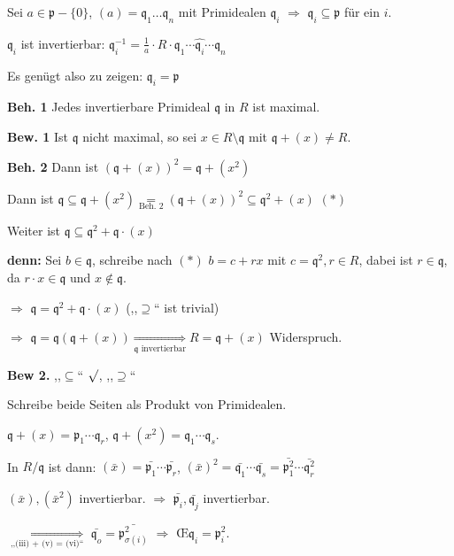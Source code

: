 \begin{Bew}
\begin{description}
Sei $a \in \mathfrak{p} - \{0\}$, $(a) = \mathfrak{q}_1 \ldots \mathfrak{q}_n$ mit Primidealen $\mathfrak{q}_i$ $\Rightarrow$ $\mathfrak{q}_i \subseteq \mathfrak{p}$ f\"ur ein $i$.

$\mathfrak{q}_i$ ist invertierbar: $\mathfrak{q}_i^{-1} = \frac{1}{a} \cdot R \cdot \mathfrak{q}_1 \cdots \widehat{\mathfrak{q}_i} \cdots \mathfrak{q}_n$

Es gen\"ugt also zu zeigen: $\mathfrak{q}_i = \mathfrak{p}$

\textbf{Beh. 1} Jedes invertierbare Primideal $\mathfrak{q}$ in $R$ ist maximal.

\textbf{Bew. 1}
Ist $\mathfrak{q}$ nicht maximal, so sei $x \in R \setminus \mathfrak{q}$ mit $\mathfrak{q} + (x) \neq R$.

\textbf{Beh. 2} Dann ist $(\mathfrak{q} + (x))^2 = \mathfrak{q} + (x^2)$

Dann ist $\mathfrak{q} \subseteq \mathfrak{q} + (x^2) \underset{\text{Beh. 2}}{=} (\mathfrak{q} + (x))^2 \subseteq \mathfrak{q}^2 + (x)$ $(\ast)$

Weiter ist $\mathfrak{q} \subseteq \mathfrak{q}^2 + \mathfrak{q} \cdot (x)$

\textbf{denn:} Sei $b \in \mathfrak{q}$, schreibe nach $(\ast)$ $b = c + r x$ mit $c = \mathfrak{q}^2, r \in R$, dabei ist $r \in \mathfrak{q}$, da $r \cdot x \in \mathfrak{q}$ und $x \notin \mathfrak{q}$.

$\Rightarrow$ $\mathfrak{q} = \mathfrak{q}^2 + \mathfrak{q} \cdot (x)$ (,,$\supseteq$`` ist trivial)

$\Rightarrow$ $\mathfrak{q} = \mathfrak{q} (\mathfrak{q} + (x)) \underset{\mathfrak{q}\text{ invertierbar}}\Rightarrow R = \mathfrak{q} + (x)$ Widerspruch.

\textbf{Bew 2.} ,,$\subseteq$`` $\surd$, ,,$\supseteq$``

Schreibe beide Seiten als Produkt von Primidealen.

$\mathfrak{q} + (x) = \mathfrak{p}_1 \cdots \mathfrak{q}_r$, $\mathfrak{q} + (x^2) = \mathfrak{q}_1 \cdots \mathfrak{q}_s$.

In $R / \mathfrak{q}$ ist dann: $(\bar{x}) = \bar{\mathfrak{p}_1} \cdots \bar{\mathfrak{p}_r}$, $(\bar{x})^2 = \bar{\mathfrak{q}_1} \cdots \bar{\mathfrak{q}_s} = \bar{\mathfrak{p}_1^2} \cdots \bar{\mathfrak{q}_r^2}$

$(\bar{x}), (\bar{x}^2)$ invertierbar. $\Rightarrow$ $\bar{\mathfrak{p}_i}, \bar{\mathfrak{q}_j}$ invertierbar.

$\underset{\text{,,(iii) + (v) = (vi)``}}{\Rightarrow}$ $\bar{\mathfrak{q}_o} = \bar{\mathfrak{p}_{\sigma(i)}^2}$ $\Rightarrow$ \OE $\mathfrak{q}_i = \mathfrak{p}_i^2$.

\end{description}
\end{Bew}

